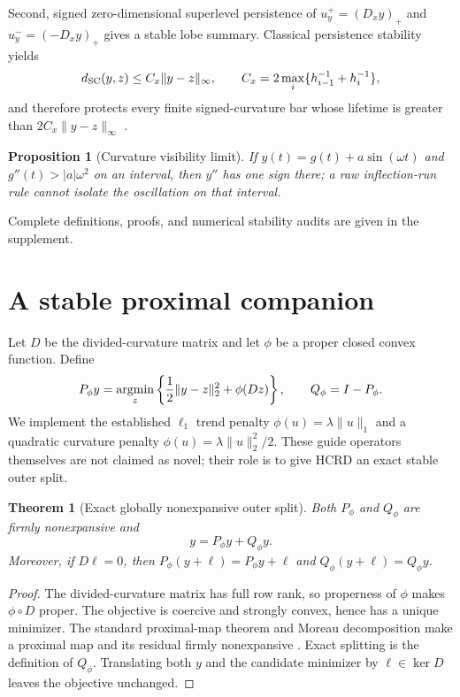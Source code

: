 \documentclass[review,onefignum,onetabnum]{siamonline250211}
\providecommand{\citep}[1]{\cite{#1}}
\newtheorem{theorem}{Theorem}
\newtheorem{proposition}{Proposition}
\begin{document}
Second, signed zero-dimensional superlevel persistence of
$u_y^+=(D_xy)_+$ and $u_y^-=(-D_xy)_+$ gives a stable lobe summary.  Classical
persistence stability yields
\begin{equation}
d_{\rm SC}(y,z)\le C_x\|y-z\|_\infty,
\qquad C_x=2\max_i\{h_{i-1}^{-1}+h_i^{-1}\},
\end{equation}
and therefore protects every finite signed-curvature bar whose lifetime is
greater than $2C_x\|y-z\|_\infty$ \citep{cohensteiner2007stability}.

\begin{proposition}[Curvature visibility limit]
If $y(t)=g(t)+a\sin(\omega t)$ and
$g''(t)>|a|\omega^2$ on an interval, then $y''$ has one sign there; a raw
inflection-run rule cannot isolate the oscillation on that interval.
\end{proposition}

Complete definitions, proofs, and numerical stability audits are given in the
supplement.
\else
\section{A stable proximal companion}
Let $D$ be the divided-curvature matrix and let $\phi$ be a proper closed
convex function.  Define
\begin{equation}
P_\phi y=\mathop{\rm argmin}_z
\left\{\frac12\|y-z\|_2^2+\phi(Dz)\right\},\qquad
Q_\phi=I-P_\phi .
\end{equation}
We implement the established $\ell_1$ trend penalty
$\phi(u)=\lambda\|u\|_1$ \citep{kim2009trend} and a quadratic curvature
penalty $\phi(u)=\lambda\|u\|_2^2/2$.  These guide operators themselves are
not claimed as novel; their role is to give HCRD an exact stable outer split.

\begin{theorem}[Exact globally nonexpansive outer split]
\label{thm:prox}
Both $P_\phi$ and $Q_\phi$ are firmly nonexpansive and
\begin{equation}
y=P_\phi y+Q_\phi y.
\end{equation}
Moreover, if $D\ell=0$, then
$P_\phi(y+\ell)=P_\phi y+\ell$ and $Q_\phi(y+\ell)=Q_\phi y$.
\end{theorem}
\begin{proof}
The divided-curvature matrix has full row rank, so properness of $\phi$ makes
$\phi\circ D$ proper.  The objective is coercive and strongly convex, hence has
a unique minimizer.  The standard
proximal-map theorem and Moreau decomposition make a proximal map and its
residual firmly nonexpansive \citep{parikh2014proximal}.  Exact splitting is
the definition of $Q_\phi$.  Translating both $y$ and the candidate minimizer
by $\ell\in\ker D$ leaves the objective unchanged.
\end{proof}
\end{document}
